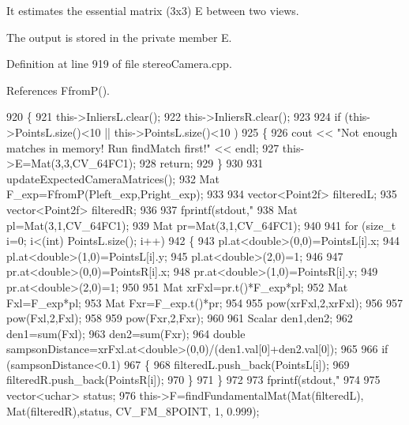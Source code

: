 It estimates the essential matrix (3x3) E between two views. 

The output is stored in the private member E. 

Definition at line 919 of file stereo\+Camera.\+cpp.



References Ffrom\+P().


\begin{DoxyCode}
920 \{
921     this->InliersL.clear();
922     this->InliersR.clear();
923 
924     \textcolor{keywordflow}{if} (this->PointsL.size()<10 || this->PointsL.size()<10 )
925     \{
926         cout << \textcolor{stringliteral}{"Not enough matches in memory! Run findMatch first!"} << endl;
927         this->E=Mat(3,3,CV\_64FC1);
928         \textcolor{keywordflow}{return};
929     \}
930 
931     updateExpectedCameraMatrices();
932     Mat F\_exp=FfromP(Pleft\_exp,Pright\_exp);
933 
934     vector<Point2f> filteredL;
935     vector<Point2f> filteredR;
936 
937     fprintf(stdout,\textcolor{stringliteral}{"%
938     Mat pl=Mat(3,1,CV\_64FC1);
939     Mat pr=Mat(3,1,CV\_64FC1);
940 
941     \textcolor{keywordflow}{for} (\textcolor{keywordtype}{size\_t} i=0; i<(int) PointsL.size(); i++)
942     \{
943         pl.at<\textcolor{keywordtype}{double}>(0,0)=PointsL[i].x;
944         pl.at<\textcolor{keywordtype}{double}>(1,0)=PointsL[i].y;
945         pl.at<\textcolor{keywordtype}{double}>(2,0)=1;
946 
947         pr.at<\textcolor{keywordtype}{double}>(0,0)=PointsR[i].x;
948         pr.at<\textcolor{keywordtype}{double}>(1,0)=PointsR[i].y;
949         pr.at<\textcolor{keywordtype}{double}>(2,0)=1;
950 
951         Mat xrFxl=pr.t()*F\_exp*pl;
952         Mat Fxl=F\_exp*pl;
953         Mat Fxr=F\_exp.t()*pr;
954 
955         pow(xrFxl,2,xrFxl);
956 
957         pow(Fxl,2,Fxl);
958 
959         pow(Fxr,2,Fxr);
960 
961         Scalar den1,den2;
962         den1=sum(Fxl);
963         den2=sum(Fxr);
964         \textcolor{keywordtype}{double} sampsonDistance=xrFxl.at<\textcolor{keywordtype}{double}>(0,0)/(den1.val[0]+den2.val[0]);
965 
966         \textcolor{keywordflow}{if} (sampsonDistance<0.1)
967         \{
968             filteredL.push\_back(PointsL[i]);
969             filteredR.push\_back(PointsR[i]);
970         \}
971     \}
972 
973     fprintf(stdout,\textcolor{stringliteral}{"%
974 
975     vector<uchar> status;
976     this->F=findFundamentalMat(Mat(filteredL), Mat(filteredR),status, CV\_FM\_8POINT, 1, 0.999);
}}
\end{DoxyCode}
